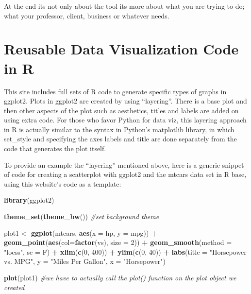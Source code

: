 \documentclass[]{book}
\newenvironment{Shaded}{\begin{snugshade}}{\end{snugshade}}
\newcommand{\KeywordTok}[1]{\textcolor[rgb]{0.13,0.29,0.53}{\textbf{#1}}}
\newcommand{\DataTypeTok}[1]{\textcolor[rgb]{0.13,0.29,0.53}{#1}}
\newcommand{\DecValTok}[1]{\textcolor[rgb]{0.00,0.00,0.81}{#1}}
\newcommand{\StringTok}[1]{\textcolor[rgb]{0.31,0.60,0.02}{#1}}
\newcommand{\CommentTok}[1]{\textcolor[rgb]{0.56,0.35,0.01}{\textit{#1}}}
\newcommand{\OperatorTok}[1]{\textcolor[rgb]{0.81,0.36,0.00}{\textbf{#1}}}
\newcommand{\NormalTok}[1]{#1}
\theoremstyle{definition}
\theoremstyle{definition}
\theoremstyle{definition}
\theoremstyle{remark}
\begin{document}
At the end its not only about the tool its more about what you are
trying to do; what your professor, client, business or whatever needs.

\section{Reusable Data Visualization Code in
R}\label{reusable-data-visualization-code-in-r}

\citep{viz_R}

This site includes full sets of R code to generate specific types of
graphs in ggplot2. Plots in ggplot2 are created by using ``layering''.
There is a base plot and then other aspects of the plot such as
aesthetics, titles and labels are added on using extra code. For those
who favor Python for data viz, this layering approach in R is actually
similar to the syntax in Python's matplotlib library, in which
set\_style and specifying the axes labels and title are done separately
from the code that generates the plot itself.

To provide an example the ``layering'' mentioned above, here is a
generic snippet of code for creating a scatterplot with ggplot2 and the
mtcars data set in R base, using this website's code as a template:

\begin{Shaded}
\begin{Highlighting}[]
\KeywordTok{library}\NormalTok{(ggplot2)}

\KeywordTok{theme_set}\NormalTok{(}\KeywordTok{theme_bw}\NormalTok{())  }\CommentTok{#set background theme}

\NormalTok{plot1 <-}\StringTok{ }\KeywordTok{ggplot}\NormalTok{(mtcars, }\KeywordTok{aes}\NormalTok{(}\DataTypeTok{x =}\NormalTok{ hp, }\DataTypeTok{y =}\NormalTok{ mpg)) }\OperatorTok{+}\StringTok{ }\KeywordTok{geom_point}\NormalTok{(}\KeywordTok{aes}\NormalTok{(}\DataTypeTok{col=}\KeywordTok{factor}\NormalTok{(vs), }\DataTypeTok{size =} \DecValTok{2}\NormalTok{)) }\OperatorTok{+}\StringTok{ }\KeywordTok{geom_smooth}\NormalTok{(}\DataTypeTok{method =} \StringTok{"loess"}\NormalTok{, }\DataTypeTok{se =}\NormalTok{ F) }\OperatorTok{+}\StringTok{ }\KeywordTok{xlim}\NormalTok{(}\KeywordTok{c}\NormalTok{(}\DecValTok{0}\NormalTok{, }\DecValTok{400}\NormalTok{)) }\OperatorTok{+}\StringTok{ }\KeywordTok{ylim}\NormalTok{(}\KeywordTok{c}\NormalTok{(}\DecValTok{0}\NormalTok{, }\DecValTok{40}\NormalTok{)) }\OperatorTok{+}\StringTok{ }\KeywordTok{labs}\NormalTok{(}\DataTypeTok{title =} \StringTok{"Horsepower vs. MPG"}\NormalTok{, }\DataTypeTok{y =} \StringTok{"Miles Per Gallon"}\NormalTok{, }\DataTypeTok{x =} \StringTok{"Horsepower"}\NormalTok{)}

\KeywordTok{plot}\NormalTok{(plot1)  }\CommentTok{#we have to actually call the plot() function on the plot object we created}
\end{Highlighting}
\end{Shaded}
\end{document}
